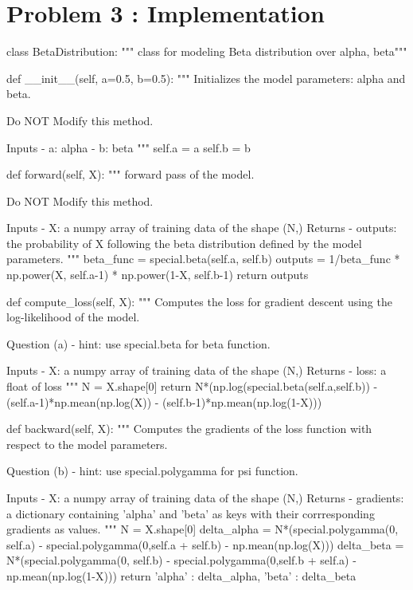 \documentclass[10pt]{article}
\begin{document}
\section{Problem 3 : Implementation}
\begin{python}
class BetaDistribution:
    """ class for modeling Beta distribution over alpha, beta"""

    def __init__(self, a=0.5, b=0.5):
        """
        Initializes the model parameters: alpha and beta.

        Do NOT Modify this method.

        Inputs
        - a: alpha
        - b: beta
        """
        self.a = a
        self.b = b

    def forward(self, X):
        """
        forward pass of the model.

        Do NOT Modify this method.

        Inputs
        - X: a numpy array of training data of the shape (N,)
        Returns
        - outputs: the probability of X following the beta distribution defined by the model parameters.
        """
        beta_func = special.beta(self.a, self.b)
        outputs = 1/beta_func * np.power(X, self.a-1) * np.power(1-X, self.b-1)
        return outputs

    def compute_loss(self, X):
        """
        Computes the loss for gradient descent using the log-likelihood of the model.

        Question (a)
        - hint: use special.beta for beta function.

        Inputs
        - X: a numpy array of training data of the shape (N,)
        Returns
        - loss: a float of loss
        """
        N = X.shape[0]
        return N*(np.log(special.beta(self.a,self.b)) - (self.a-1)*np.mean(np.log(X)) - (self.b-1)*np.mean(np.log(1-X)))

    def backward(self, X):
        """
        Computes the gradients of the loss function with respect to the model parameters.

        Question (b)
        - hint: use special.polygamma for psi function.

        Inputs
        - X: a numpy array of training data of the shape (N,)
        Returns
        - gradients: a dictionary containing 'alpha' and 'beta' as keys with their corrresponding gradients as values.
        """
        N = X.shape[0]
        delta_alpha =  N*(special.polygamma(0, self.a) - special.polygamma(0,self.a + self.b) - np.mean(np.log(X)))
        delta_beta = N*(special.polygamma(0, self.b) - special.polygamma(0,self.b + self.a) - np.mean(np.log(1-X)))
        return {'alpha' : delta_alpha, 'beta' : delta_beta}


\end{python}
\end{document}
